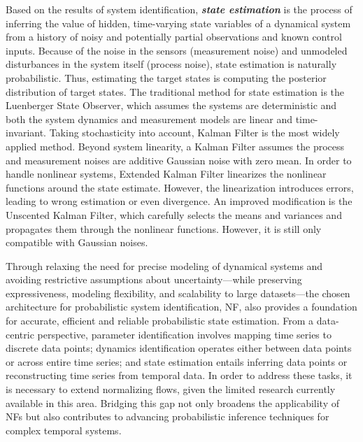 Based on the results of system identification, {\bfseries\itshape state estimation} is the process of inferring the value of hidden, time-varying state variables of a dynamical system from a history of noisy and potentially partial observations and known control inputs. Because of the noise in the sensors (measurement noise) and unmodeled disturbances in the system itself (process noise), state estimation is naturally probabilistic. Thus, estimating the target states is computing the posterior distribution of target states. The traditional method for state estimation is the Luenberger State Observer, which assumes the systems are deterministic and both the system dynamics and measurement models are linear and time-invariant. Taking stochasticity into account, Kalman Filter is the most widely applied method. Beyond system linearity, a Kalman Filter assumes the process and measurement noises are additive Gaussian noise with zero mean. In order to handle nonlinear systems, Extended Kalman Filter linearizes the nonlinear functions around the state estimate. However, the linearization introduces errors, leading to wrong estimation or even divergence. An improved modification is the Unscented Kalman Filter, which carefully selects the means and variances and propagates them through the nonlinear functions. However, it is still only compatible with Gaussian noises.

Through relaxing the need for precise modeling of dynamical systems and avoiding restrictive assumptions about uncertainty---while preserving expressiveness, modeling flexibility, and scalability to large datasets---the chosen architecture for probabilistic system identification, \ac{NF}, also provides a foundation for accurate, efficient and reliable probabilistic state estimation. From a data-centric perspective, parameter identification involves mapping time series to discrete data points; dynamics identification operates either between data points or across entire time series; and state estimation entails inferring data points or reconstructing time series from temporal data. In order to address these tasks, it is necessary to extend normalizing flows, given the limited research currently available in this area. Bridging this gap not only broadens the applicability of \acp{NF} but also contributes to advancing probabilistic inference techniques for complex temporal systems.

